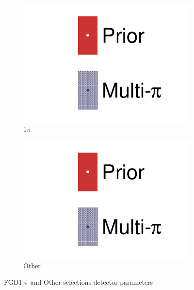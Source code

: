 \begin{figure}[h]
	\begin{subfigure}[t]{0.32\textwidth}
		\includegraphics[width=\textwidth,page=46, trim={0mm 0mm 0mm 0mm}, clip]{figures/mach3/2018/data/2018a_FixedCov_RedCov_Mpi_Data_merge_drawPar_withDet}
		\caption{1$\pi$}
	\end{subfigure}
	\begin{subfigure}[t]{0.32\textwidth}
		\includegraphics[width=\textwidth,page=47, trim={0mm 0mm 0mm 0mm}, clip]{figures/mach3/2018/data/2018a_FixedCov_RedCov_Mpi_Data_merge_drawPar_withDet}
		\caption{Other}
	\end{subfigure}
	\caption{FGD1 $\pi$ and Other selections detector parameters}
	\label{fig:data_multipi_det_fdg1_cc1piOth_nubar}
\end{figure}

